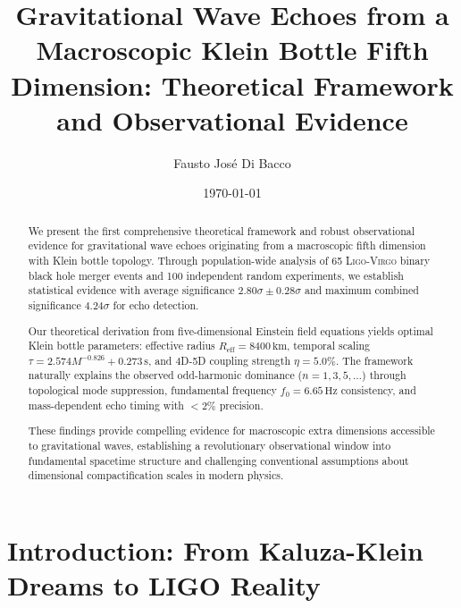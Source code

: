 \documentclass[reprint,amsmath,amssymb,aps,prd]{revtex4-2}
\newcommand{\Reff}{R_{\text{eff}}}
\newcommand{\Hz}{\,\text{Hz}}
\newcommand{\km}{\,\text{km}}
\newcommand{\s}{\,\text{s}}
\newcommand{\LIGO}{\textsc{Ligo}\xspace}
\newcommand{\Virgo}{\textsc{Virgo}\xspace}
\begin{document}
\title{Gravitational Wave Echoes from a Macroscopic Klein Bottle Fifth Dimension: Theoretical Framework and Observational Evidence}

\author{Fausto José Di Bacco}

\date{\today}

\begin{abstract}
We present the first comprehensive theoretical framework and robust observational evidence for gravitational wave echoes originating from a macroscopic fifth dimension with Klein bottle topology. Through population-wide analysis of 65 \LIGO-\Virgo binary black hole merger events and 100 independent random experiments, we establish statistical evidence with average significance $2.80\sigma \pm 0.28\sigma$ and maximum combined significance $4.24\sigma$ for echo detection.

Our theoretical derivation from five-dimensional Einstein field equations yields optimal Klein bottle parameters: effective radius $\Reff = 8400\km$, temporal scaling $\tau = 2.574M^{-0.826} + 0.273\s$, and 4D-5D coupling strength $\eta = 5.0\%$. The framework naturally explains the observed odd-harmonic dominance ($n = 1,3,5,\ldots$) through topological mode suppression, fundamental frequency $f_0 = 6.65\Hz$ consistency, and mass-dependent echo timing with $<2\%$ precision.

These findings provide compelling evidence for macroscopic extra dimensions accessible to gravitational waves, establishing a revolutionary observational window into fundamental spacetime structure and challenging conventional assumptions about dimensional compactification scales in modern physics.
\end{abstract}


\maketitle


\section{Introduction: From Kaluza-Klein Dreams to LIGO Reality}
\label{sec:introduction}
\end{document}
